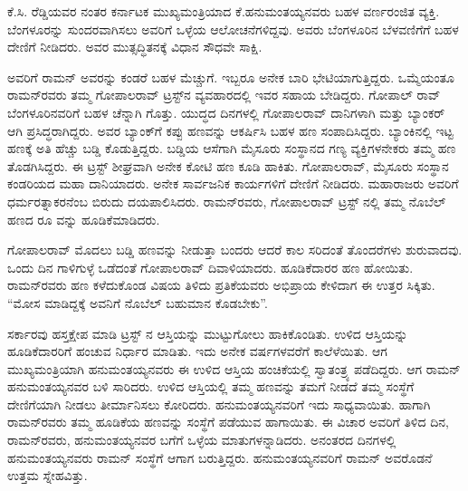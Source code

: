 
\vskip 2pt

ಕೆ.ಸಿ. ರೆಡ್ಡಿಯವರ ನಂತರ ಕರ್ನಾಟಕ ಮುಖ್ಯಮಂತ್ರಿಯಾದ ಕೆ.ಹನುಮಂತಯ್ಯನವರು ಬಹಳ ವರ್ಣರಂಜಿತ ವ್ಯಕ್ತಿ. ಬೆಂಗಳೂರನ್ನು ಸುಂದರವಾಗಿಸಲು ಅವರಿಗೆ ಒಳ್ಳೆಯ ಆಲೋಚನೆಗಳಿದ್ದವು. ಅವರು ಬೆಂಗಳೂರಿನ ಬೆಳವಣಿಗೆಗೆ ಬಹಳ ದೇಣಿಗೆ ನೀಡಿದರು. ಅವರ ಮುತ್ಸದ್ಧಿತನಕ್ಕೆ ವಿಧಾನ ಸೌಧವೇ ಸಾಕ್ಷಿ.

ಅವರಿಗೆ ರಾಮನ್ ಅವರನ್ನು ಕಂಡರೆ ಬಹಳ ಮೆಚ್ಚುಗೆ. ಇಬ್ಬರೂ ಅನೇಕ ಬಾರಿ ಭೇಟಿಯಾಗು\-ತ್ತಿದ್ದರು. ಒಮ್ಮೆಯಂತೂ ರಾಮನ್‍ರವರು ತಮ್ಮ ಗೋಪಾಲರಾವ್ ಟ್ರಸ್ಟ್‌ನ ವ್ಯವಹಾರದಲ್ಲಿ ಇವರ ಸಹಾಯ ಬೇಡಿದ್ದರು. ಗೋಪಾಲ್ ರಾವ್ ಬೆಂಗಳೂರಿನವರಿಗೆ ಬಹಳ ಚೆನ್ನಾಗಿ ಗೊತ್ತು. ಯುದ್ಧದ ದಿನಗಳಲ್ಲಿ ಗೋಪಾಲರಾವ್ ದಾನಿಗಳಾಗಿ ಮತ್ತು ಬ್ಯಾಂಕರ್ ಆಗಿ ಪ್ರಸಿದ್ಧರಾಗಿದ್ದರು. ಅವರ ಬ್ಯಾಂಕ್‍ಗೆ ಕಪ್ಪು ಹಣವನ್ನು ಆಕರ್ಷಿಸಿ ಬಹಳ ಹಣ ಸಂಪಾದಿಸಿದ್ದರು. ಬ್ಯಾಂಕಿನಲ್ಲಿ ಇಟ್ಟ ಹಣಕ್ಕೆ ಅತಿ ಹೆಚ್ಚು ಬಡ್ಡಿ ಕೊಡುತ್ತಿದ್ದರು. ಬಡ್ಡಿಯ ಆಸೆಗಾಗಿ ಮೈಸೂರು ಸಂಸ್ಥಾನದ ಗಣ್ಯ ವ್ಯಕ್ತಿಗಳನೇಕರು ತಮ್ಮ ಹಣ ತೊಡಗಿಸಿದ್ದರು. ಈ ಟ್ರಸ್ಟ್ ಶೀಘ್ರವಾಗಿ ಅನೇಕ ಕೋಟಿ ಹಣ ಕೂಡಿ ಹಾಕಿತು. ಗೋಪಾಲರಾವ್, ಮೈಸೂರು ಸಂಸ್ಥಾನ ಕಂಡರಿಯದ ಮಹಾ ದಾನಿಯಾದರು. ಅನೇಕ ಸಾರ್ವಜನಿಕ ಕಾರ್ಯಗಳಿಗೆ ದೇಣಿಗೆ ನೀಡಿದರು. ಮಹಾರಾಜರು ಅವರಿಗೆ ಧರ್ಮರತ್ನಾಕರನೆಂಬ ಬಿರುದು ದಯಪಾಲಿಸಿದರು. ರಾಮನ್‍ರವರು, ಗೋಪಾಲರಾವ್ ಟ್ರಸ್ಟ್ ನಲ್ಲಿ ತಮ್ಮ ನೊಬೆಲ್ ಹಣದ ರೂ  ವನ್ನು ಹೂಡಿಕೆಮಾಡಿದರು.

ಗೋಪಾಲರಾವ್ ಮೊದಲು ಬಡ್ಡಿ ಹಣವನ್ನು ನೀಡುತ್ತಾ ಬಂದರು ಆದರೆ ಕಾಲ ಸರಿದಂತೆ ತೊಂದರೆಗಳು ಶುರುವಾದವು. ಒಂದು ದಿನ ಗಾಳಿಗುಳ್ಳೆ ಒಡೆದಂತೆ ಗೋಪಾಲರಾವ್ ದಿವಾಳಿಯಾದರು. ಹೂಡಿಕೆದಾರರ ಹಣ ಹೋಯಿತು. ರಾಮನ್‍ರವರು ಹಣ ಕಳೆದುಕೊಂಡ ವಿಷಯ ತಿಳಿದು ಪ್ರತಿಕೆಯವರು ಅಭಿಪ್ರಾಯ ಕೇಳಿದಾಗ ಈ ಉತ್ತರ ಸಿಕ್ಕಿತು. “ಮೋಸ ಮಾಡಿದ್ದಕ್ಕೆ ಅವನಿಗೆ ನೊಬೆಲ್ ಬಹುಮಾನ ಕೊಡಬೇಕು”.

ಸರ್ಕಾರವು ಹಸ್ತಕ್ಷೇಪ ಮಾಡಿ ಟ್ರಸ್ಟ್ ನ ಆಸ್ತಿಯನ್ನು ಮುಟ್ಟುಗೋಲು ಹಾಕಿಕೊಂಡಿತು. ಉಳಿದ ಆಸ್ತಿಯನ್ನು ಹೂಡಿಕೆದಾರರಿಗೆ ಹಂಚುವ ನಿರ್ಧಾರ ಮಾಡಿತು. ಇದು ಅನೇಕ ವರ್ಷಗಳವರೆಗೆ ಕಾಲೆಳೆಯಿತು. ಆಗ ಮುಖ್ಯಮಂತ್ರಿಯಾಗಿ ಹನುಮಂತಯ್ಯನವರು ಈ ಉಳಿದ ಆಸ್ತಿಯ ಹಂಚಿಕೆ\-ಯಲ್ಲಿ ಸ್ವಾತಂತ್ರ್ಯ ಪಡೆದಿದ್ದರು. ಆಗ ರಾಮನ್ ಹನುಮಂತಯ್ಯನವರ ಬಳಿ ಸಾರಿದರು. ಉಳಿದ ಆಸ್ತಿಯಲ್ಲಿ ತಮ್ಮ ಹಣವನ್ನು ತಮಗೆ ನೀಡದೆ ತಮ್ಮ ಸಂಸ್ಥೆಗೆ ದೇಣಿಗೆಯಾಗಿ ನೀಡಲು ತೀರ್ಮಾನಿಸಲು ಕೋರಿದರು. ಹನುಮಂತಯ್ಯನವರಿಗೆ ಇದು ಸಾಧ್ಯವಾಯಿತು. ಹಾಗಾಗಿ ರಾಮನ್‍ರವರು ತಮ್ಮ ಹೂಡಿಕೆಯ ಹಣವನ್ನು ಸಂಸ್ಥೆಗೆ ಪಡೆಯುವ ಹಾಗಾಯಿತು. ಈ ವಿಚಾರ ಅವರಿಗೆ ತಿಳಿದ ದಿನ, ರಾಮನ್‍ರವರು, ಹನುಮಂತಯ್ಯನವರ ಬಗೆಗೆ ಒಳ್ಳೆಯ ಮಾತುಗಳನ್ನಾಡಿದರು. ಅನಂತರದ ದಿನಗಳಲ್ಲಿ ಹನುಮಂತಯ್ಯನವರು ರಾಮನ್ ಸಂಸ್ಥೆಗೆ ಆಗಾಗ ಬರುತ್ತಿದ್ದರು. ಹನುಮಂತಯ್ಯನವರಿಗೆ ರಾಮನ್ ಅವರೊಡನೆ ಉತ್ತಮ ಸ್ನೇಹವಿತ್ತು.

